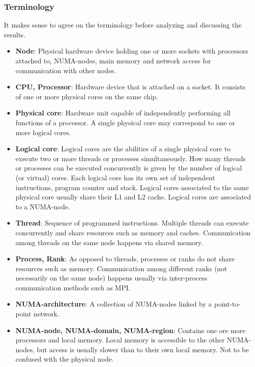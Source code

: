 \documentclass{article}
\theoremstyle{plain} %
\theoremstyle{convention} %
\theoremstyle{remark} %
\numberwithin{equation}{section}
\begin{document}
\subsubsection{Terminology}

It makes sense to agree on the terminology before analyzing and discussing the results.

\begin{itemize}
    \item \textbf{Node}: Physical hardware device holding one or more sockets with processors attached to, NUMA-nodes, main memory and network access for communication with other nodes.
    \item \textbf{CPU, Processor}: Hardware device that is attached on a socket. It consists of one or more physical cores on the same chip.
    \item \textbf{Physical core}: Hardware unit capable of independently performing all functions of a processor. A single physical core may correspond to one or more logical cores.
    \item \textbf{Logical core}: Logical cores are the abilities of a single physical core to execute two or more threads or processes simultaneously. How many threads or processes can be executed concurrently is given by the number of logical (or virtual) cores. Each logical core has its own set of independent instructions, program counter and stack. Logical cores associated to the same physical core usually share their L1 and L2 cache. Logical cores are associated to a NUMA-node.
    \item \textbf{Thread}: Sequence of programmed instructions. Multiple threads can execute concurrently and share resources such as memory and caches. Communication among threads on the same node happens via shared memory.
    \item \textbf{Process, Rank}: As opposed to threads, processes or ranks do not share resources such as memory. Communication among different ranks (not necessarily on the same node) happens usually via inter-process communication methods such as MPI.
    \item \textbf{NUMA-architecture}: A collection of NUMA-nodes linked by a point-to-point network.
    \item \textbf{NUMA-node, NUMA-domain, NUMA-region}: Contains one ore more processors and local memory. Local memory is accessible to the other NUMA-nodes, but access is usually slower than to their own local memory. Not to be confused with the physical node.
\end{itemize}
\end{document}
